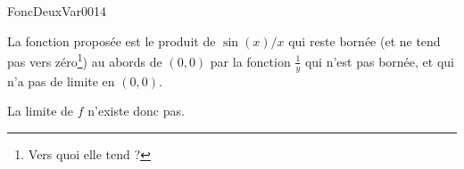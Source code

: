 

\begin{corrige}{FoncDeuxVar0014}

	La fonction proposée est le produit de $\sin(x)/x$ qui reste bornée (et ne tend pas vers zéro\footnote{Vers quoi elle tend ?}) au abords de $(0,0)$ par la fonction $\frac{1}{ y }$ qui n'est pas bornée, et qui n'a pas de limite en $(0,0)$.

	La limite de $f$ n'existe donc pas.

\end{corrige}
